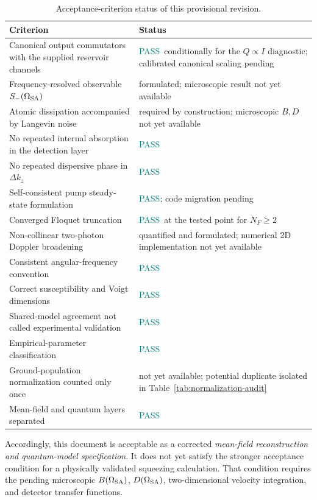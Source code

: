 \documentclass[11pt,a4paper]{article}
\newcommand{\pending}{\textcolor{amber}{not yet available}}
\newcommand{\pass}{\textcolor{teal}{PASS}}
\begin{document}
\begin{table}[ht]
\centering
\caption{Acceptance-criterion status of this provisional revision.}
\label{tab:acceptance}
\small
\begin{tabularx}{\textwidth}{Y L{4.0cm}}
\toprule
Criterion & Status\\
\midrule
Canonical output commutators with the supplied reservoir channels &
\pass\ conditionally for the $Q\propto I$ diagnostic; calibrated canonical
scaling pending\\
Frequency-resolved observable $S_-(\Omega_{\rm SA})$ &
formulated; microscopic result \pending\\
Atomic dissipation accompanied by Langevin noise &
required by construction; microscopic $B,D$ \pending\\
No repeated internal absorption in the detection layer & \pass\\
No repeated dispersive phase in $\Delta k_z$ & \pass\\
Self-consistent pump steady-state formulation & \pass;
code migration pending\\
Converged Floquet truncation & \pass\ at the tested point for $N_F\geq2$\\
Non-collinear two-photon Doppler broadening &
quantified and formulated; numerical 2D implementation \pending\\
Consistent angular-frequency convention & \pass\\
Correct susceptibility and Voigt dimensions & \pass\\
Shared-model agreement not called experimental validation & \pass\\
Empirical-parameter classification & \pass\\
Ground-population normalization counted only once &
\pending; potential duplicate isolated in Table~\ref{tab:normalization-audit}\\
Mean-field and quantum layers separated & \pass\\
\bottomrule
\end{tabularx}
\end{table}

Accordingly, this document is acceptable as a corrected
\emph{mean-field reconstruction and quantum-model specification}. It does
not yet satisfy the stronger acceptance condition for a physically validated
squeezing calculation. That condition requires the pending microscopic
$B(\Omega_{\rm SA})$, $D(\Omega_{\rm SA})$, two-dimensional velocity
integration, and detector transfer functions.
\end{document}
